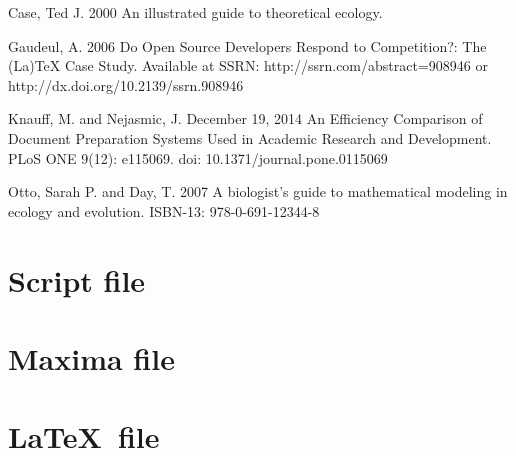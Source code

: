 \documentclass{article}
\begin{document}
\begin{thebibliography}{9}

  Case, Ted J.
  2000
  An illustrated guide to theoretical ecology.

  Gaudeul, A.
  2006
  Do Open Source Developers Respond to Competition?: The (La)TeX Case Study.
  Available at SSRN: http://ssrn.com/abstract=908946 or http://dx.doi.org/10.2139/ssrn.908946

  Knauff, M. and Nejasmic, J.
  December 19, 2014
  An Efficiency Comparison of Document Preparation Systems Used in Academic Research and Development.
  PLoS ONE 9(12): e115069. doi: 10.1371/journal.pone.0115069

  Otto, Sarah P. and Day, T.
  2007
  A biologist's guide to mathematical modeling in ecology and evolution.
  ISBN-13: 978-0-691-12344-8

\end{thebibliography}

\appendix

\section{Script file}



\section{Maxima file}



\section{\LaTeX~file}


\end{document}

